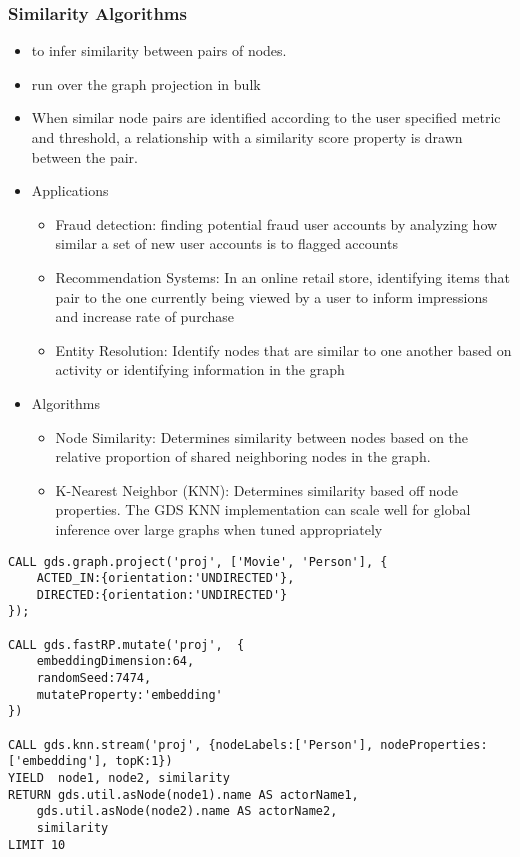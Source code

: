 \begin{frame}[fragile]\frametitle{Similarity Algorithms}

 
\begin{itemize}
\item to infer similarity between pairs of nodes. 
\item run over the graph projection in bulk
\item When similar node pairs are identified according to the user specified metric and threshold, a relationship with a similarity score property is drawn between the pair.
\item Applications
	\begin{itemize}
	\item Fraud detection: finding potential fraud user accounts by analyzing how similar a set of new user accounts is to flagged accounts
	\item Recommendation Systems: In an online retail store, identifying items that pair to the one currently being viewed by a user to inform impressions and increase rate of purchase
	\item Entity Resolution: Identify nodes that are similar to one another based on activity or identifying information in the graph
	\end{itemize}
\item Algorithms 
	\begin{itemize}
	\item Node Similarity: Determines similarity between nodes based on the relative proportion of shared neighboring nodes in the graph. 
	\item K-Nearest Neighbor (KNN): Determines similarity based off node properties. The GDS KNN implementation can scale well for global inference over large graphs when tuned appropriately
	\end{itemize}	
\end{itemize}

\begin{lstlisting}
CALL gds.graph.project('proj', ['Movie', 'Person'], {
    ACTED_IN:{orientation:'UNDIRECTED'},
    DIRECTED:{orientation:'UNDIRECTED'}
});

CALL gds.fastRP.mutate('proj',  {
    embeddingDimension:64,
    randomSeed:7474,
    mutateProperty:'embedding'
})

CALL gds.knn.stream('proj', {nodeLabels:['Person'], nodeProperties:['embedding'], topK:1})
YIELD  node1, node2, similarity
RETURN gds.util.asNode(node1).name AS actorName1,
    gds.util.asNode(node2).name AS actorName2,
    similarity
LIMIT 10
\end{lstlisting}
\end{frame}


